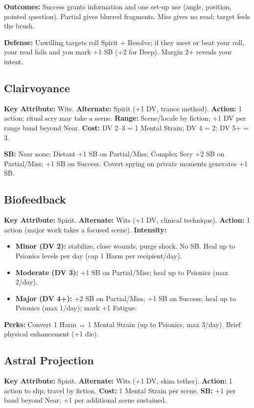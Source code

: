 \documentclass[10pt,a5paper]{book}
\begin{document}
\textbf{Outcomes:} Success grants information and one set‑up use (angle, position, pointed question). Partial gives blurred fragments. Miss gives no read; target feels the brush.

\textbf{Defense:} Unwilling targets roll Spirit + Resolve; if they meet or beat your roll, your read fails and you mark +1 SB (+2 for Deep). Margin 2+ reveals your intent.

\subsection{Clairvoyance}
\textbf{Key Attribute:} Wits. \textbf{Alternate:} Spirit (+1 DV, trance method). \textbf{Action:} 1 action; ritual scry may take a scene. \textbf{Range:} Scene/locale by fiction; +1 DV per range band beyond Near. \textbf{Cost:} DV 2--3 = 1 Mental Strain; DV 4 = 2; DV 5+ = 3.

\textbf{SB:} Near none; Distant +1 SB on Partial/Miss; Complex Scry +2 SB on Partial/Miss; +1 SB on Success. Covert spying on private moments generates +1 SB.

\subsection{Biofeedback}
\textbf{Key Attribute:} Spirit. \textbf{Alternate:} Wits (+1 DV, clinical technique). \textbf{Action:} 1 action (major work takes a focused scene). \textbf{Intensity:}
\begin{itemize}
    \item \textbf{Minor (DV 2):} stabilize, close wounds, purge shock. No SB. Heal up to Psionics levels per day (cap 1 Harm per recipient/day).
    \item \textbf{Moderate (DV 3):} +1 SB on Partial/Miss; heal up to Psionics (max 2/day).
    \item \textbf{Major (DV 4+):} +2 SB on Partial/Miss; +1 SB on Success; heal up to Psionics (max 1/day); mark +1 Fatigue.
\end{itemize}

\textbf{Perks:} Convert 1 Harm ↔ 1 Mental Strain (up to Psionics, max 3/day). Brief physical enhancement (+1 die).

\subsection{Astral Projection}
\textbf{Key Attribute:} Spirit. \textbf{Alternate:} Wits (+1 DV, skim tether). \textbf{Action:} 1 action to slip; travel by fiction. \textbf{Cost:} 1 Mental Strain per scene. \textbf{SB:} +1 per band beyond Near; +1 per additional scene sustained.
\end{document}
